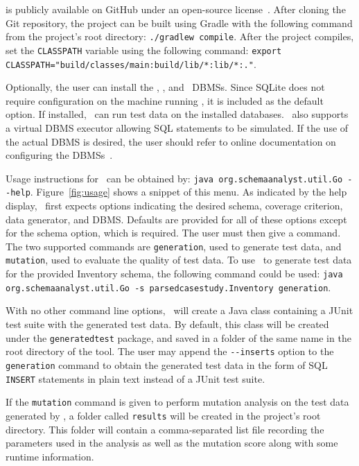 
\sa is publicly available on GitHub under an open-source license~\cite{tool}. After cloning the Git
repository, the project can be built using Gradle with the following command from the project's root directory:
\lstinline{./gradlew compile}. After the project compiles, set the \lstinline{CLASSPATH} variable using the following
command: \lstinline{export CLASSPATH="build/classes/main:build/lib/*:lib/*:."}.

Optionally, the user can install the \postgres, \sqlite, and \hypersql~DBMSs. Since SQLite does not require
configuration on the machine running \sa, it is included as the default option. If installed,
\sa~can run test data on the installed databases. \sa~also supports a virtual DBMS
executor allowing SQL statements to be simulated. If the use of the actual DBMS is desired, the user should refer to
online documentation on configuring the DBMSs~\cite{tool}.



Usage instructions for \sa~can be obtained by: \lstinline{java org.schemaanalyst.util.Go --help}.
Figure~\ref{fig:usage} shows a snippet of this menu.  As indicated by the help display, \sa~first
expects options indicating the desired schema, coverage criterion, data generator, and DBMS\@. Defaults are provided for
all of these options except for the schema option, which is required. The user must then give a command.  The two
supported commands are \lstinline{generation}, used to generate test data, and \lstinline{mutation}, used to evaluate
the quality of test data.  To use \sa~to generate test data for the provided Inventory schema, the
following command could be used: \lstinline{java org.schemaanalyst.util.Go -s parsedcasestudy.Inventory generation}.

With no other command line options, \sa~will create a Java class containing a JUnit test suite with
the generated test data. By default, this class will be created under the \texttt{generatedtest} package, and saved in a
folder of the same name in the root directory of the tool.  The user may append the \lstinline{--inserts} option to the
\lstinline{generation} command to obtain the generated test data in the form of SQL \texttt{INSERT} statements in plain
text instead of a JUnit test suite.



If the \lstinline{mutation} command is given to perform mutation analysis on the test data generated by
\sa, a folder called \lstinline{results} will be created in the project's root directory.
This folder will contain a comma-separated list file recording the parameters used in the analysis as well
as the mutation score along with some runtime information.

